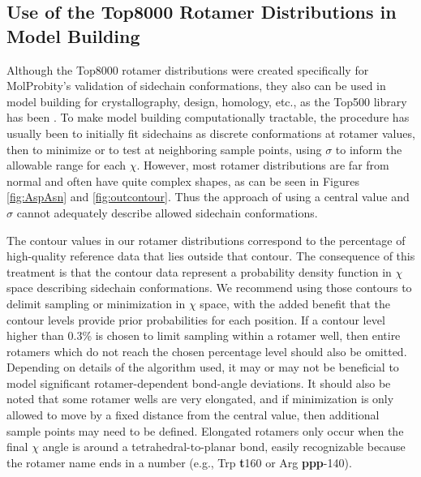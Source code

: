 \subsection{Use of the Top8000 Rotamer Distributions in Model Building}
Although the Top8000 rotamer distributions were created specifically for MolProbity's validation of sidechain conformations, they also can be used in model building for crystallography, design, homology, etc., as the Top500 library has been \cite{Arendall2005, Langer2008, Emsley:ba5144, Headd2008, Terwilliger2008, Adams:2010fk, Gainza2013,Porebski2016}. To make model building computationally tractable, \textcolor{changecolor}{the procedure has usually been to} initially fit sidechains as discrete conformations at rotamer values, then to minimize or to test at neighboring sample points, using $\sigma$ to inform the allowable range for each $\chi$. However, most rotamer distributions are far from normal and often have quite complex shapes, as can be seen in Figures \ref{fig:AspAsn} and \ref{fig:outcontour}. Thus the approach of using a central value and $\sigma$ cannot adequately describe allowed sidechain conformations. 

The contour values in our rotamer distributions correspond to the percentage of high-quality reference data that lies outside that contour. The consequence of this treatment is that the contour data represent a probability density function in $\chi$ space describing sidechain conformations. We recommend using those contours to delimit sampling or minimization in $\chi$ space, with the added benefit that the contour levels provide prior probabilities for each position. If a contour level higher than 0.3\% is chosen \textcolor{changecolor}{to limit sampling within a rotamer well}, then entire rotamers which do not reach the chosen percentage level should also be omitted. Depending on details of the algorithm used, it may or may not be beneficial to model significant rotamer-dependent bond-angle deviations. \textcolor{changecolor}{It should also be noted that some rotamer wells are very elongated, and if minimization is only allowed to move by a fixed distance from the central value, then additional sample points may need to be defined.  Elongated rotamers only occur when the final $\chi$ angle is around a tetrahedral-to-planar bond, easily recognizable because the rotamer name ends in a number (e.g., Trp \textbf{t}160 or Arg \textbf{ppp}-140).}

